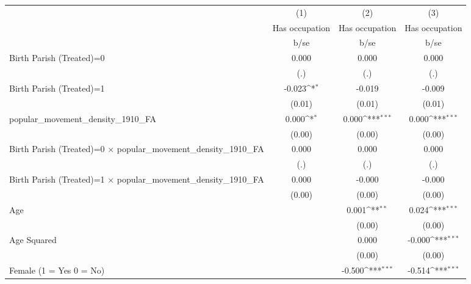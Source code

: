 {
\def\sym#1{\ifmmode^{#1}\else\(^{#1}\)\fi}
\begin{tabular}{l*{3}{c}}
\hline\hline
                    &\multicolumn{1}{c}{(1)}&\multicolumn{1}{c}{(2)}&\multicolumn{1}{c}{(3)}\\
                    &\multicolumn{1}{c}{Has occupation}&\multicolumn{1}{c}{Has occupation}&\multicolumn{1}{c}{Has occupation}\\
                    &        b/se         &        b/se         &        b/se         \\
\hline
Birth Parish (Treated)=0&       0.000         &       0.000         &       0.000         \\
                    &         (.)         &         (.)         &         (.)         \\
Birth Parish (Treated)=1&      -0.023\sym{*}  &      -0.019         &      -0.009         \\
                    &      (0.01)         &      (0.01)         &      (0.01)         \\
popular\_movement\_density\_1910\_FA&       0.000\sym{*}  &       0.000\sym{***}&       0.000\sym{***}\\
                    &      (0.00)         &      (0.00)         &      (0.00)         \\
Birth Parish (Treated)=0 $\times$ popular\_movement\_density\_1910\_FA&       0.000         &       0.000         &       0.000         \\
                    &         (.)         &         (.)         &         (.)         \\
Birth Parish (Treated)=1 $\times$ popular\_movement\_density\_1910\_FA&       0.000         &      -0.000         &      -0.000         \\
                    &      (0.00)         &      (0.00)         &      (0.00)         \\
Age                 &                     &       0.001\sym{**} &       0.024\sym{***}\\
                    &                     &      (0.00)         &      (0.00)         \\
Age Squared         &                     &       0.000         &      -0.000\sym{***}\\
                    &                     &      (0.00)         &      (0.00)         \\
Female (1 = Yes 0 = No)&                     &      -0.500\sym{***}&      -0.514\sym{***}\\

\end{tabular}}
